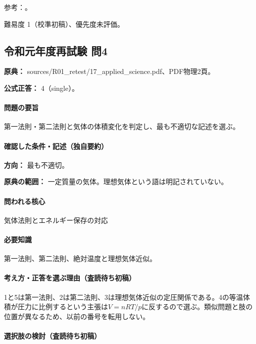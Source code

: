 \par 参考：\cite{ulvac_pirani,aist_metal_thermal}。

\par 難易度 1（校準初稿）、優先度未評価。

\subsection{令和元年度再試験 問4}
\label{q:r01-ret-applied-04}

\noindent\textbf{原典：} sources/R01\_retest/17\_applied\_science.pdf、PDF物理2頁。

\textbf{公式正答：} 4（single）。

\paragraph{問題の要旨} 第一法則・第二法則と気体の体積変化を判定し、最も不適切な記述を選ぶ。

\paragraph{確認した条件・記述（独自要約）}\mbox{}\par

\noindent\textbf{方向：} 最も不適切。\par

\noindent\textbf{原典の範囲：} 一定質量の気体。理想気体という語は明記されていない。\par

\paragraph{問われる核心} 気体法則とエネルギー保存の対応

\paragraph{必要知識} 第一法則、第二法則、絶対温度と理想気体近似。

\paragraph{考え方・正答を選ぶ理由（査読待ち初稿）} 1と5は第一法則、2は第二法則、3は理想気体近似の定圧関係である。4の等温体積が圧力に比例するという主張は\(V=nRT/p\)に反するので選ぶ。類似問題と肢の位置が異なるため、以前の番号を転用しない。

\paragraph{選択肢の検討（査読待ち初稿）}\mbox{}\par

